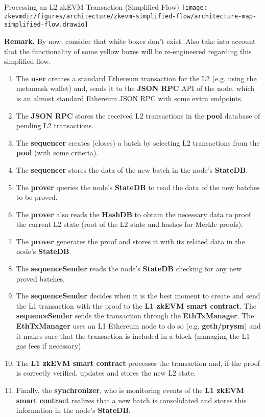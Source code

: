\begin{frame}[allowframebreaks]{Processing an L2 zkEVM Transaction (Simplified Flow)}
\centering
\texttt{[image: \\zkevmdir/figures/architecture/zkevm-simplified-flow/architecture-map-simplified-flow.drawio]}

\vspace{-0.2cm}
\tiny
\textbf{Remark.} By now, consider that white boxes don't exist. Also take into account that the functionality of some yellow boxes will be re-engineered regarding this simplified flow.

\framebreak
\begin{enumerate}
\small
\item The \textbf{user} creates a standard Ethereum transaction for the L2 (e.g. using the metamask wallet) and, 
sends it to the \textbf{JSON RPC} API of the node, which is an almost standard Ethereum JSON RPC with some extra endpoints.
\item The \textbf{JSON RPC} stores the received L2 transactions in the \textbf{pool} database of pending L2 transactions.
\item The \textbf{sequencer} creates (closes) a batch by selecting L2 transactions from the \textbf{pool} (with some criteria).
\item The \textbf{sequencer} stores the data of the new batch in the node's \textbf{StateDB}.
\item The \textbf{prover} queries the node's \textbf{StateDB} to read the data of the new batches to be proved.
\item The \textbf{prover} also reads the \textbf{HashDB} to obtain the necessary data to proof the current L2 state (root of the L2 state and hashes for Merkle proofs).
\item The \textbf{prover} generates the proof and stores it with its related data in the node's \textbf{StateDB}.

\framebreak
\item The \textbf{sequenceSender} reads the node's \textbf{StateDB} checking for any new proved batches.
\item The \textbf{sequenceSender} decides when it is the best moment to create and send the L1 transaction with the proof to the \textbf{L1 zkEVM smart contract}. The \textbf{sequenceSender} sends the transaction through the \textbf{EthTxManager}. 
The \textbf{EthTxManager} uses an L1 Ethereum node to do so (e.g. \textbf{geth/prysm}) and it makes sure that the transaction is included in a block (managing the L1 gas fees if necessary).
\item The \textbf{L1 zkEVM smart contract} processes the transaction and, if the proof is correctly verified, updates and stores the new L2 state.
\item Finally, the \textbf{synchronizer}, who is monitoring events of the \textbf{L1 zkEVM smart contract} realizes that a new batch is 
consolidated and stores this information in the node's \textbf{StateDB}.
\end{enumerate}
\end{frame}





